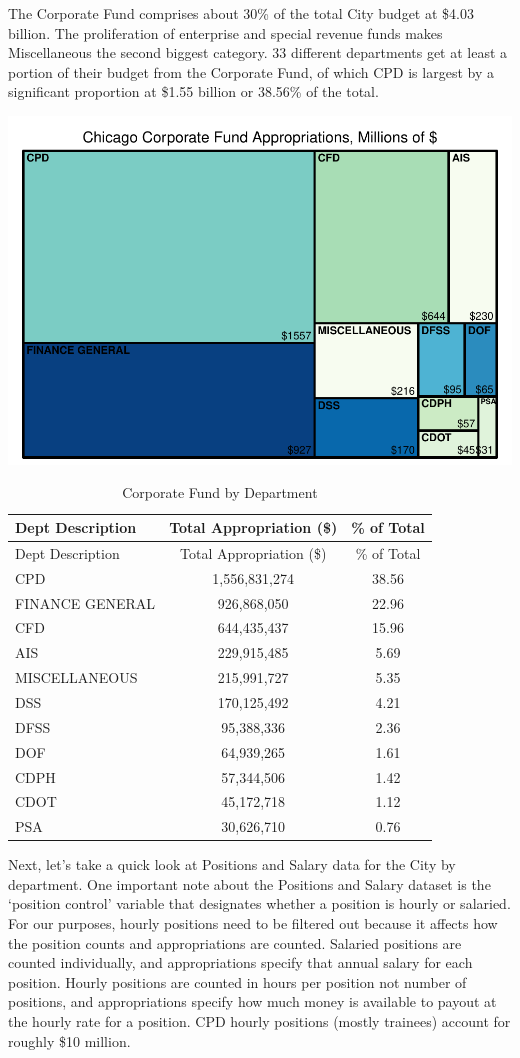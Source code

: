 \documentclass[
]{article}
\begin{document}
The Corporate Fund comprises about 30\% of the total City budget at
\$4.03 billion. The proliferation of enterprise and special revenue
funds makes Miscellaneous the second biggest category. 33 different
departments get at least a portion of their budget from the Corporate
Fund, of which CPD is largest by a significant proportion at \$1.55
billion or 38.56\% of the total.

\begin{center}\includegraphics{cpd_budget_analysis_files/figure-latex/reduced corporate fund treemap-1} \end{center}

\begin{longtable}[]{@{}lcc@{}}
\caption{Corporate Fund by Department}\tabularnewline
\toprule
Dept Description & Total Appropriation (\$) & \% of Total\tabularnewline
\midrule
\endfirsthead
\toprule
Dept Description & Total Appropriation (\$) & \% of Total\tabularnewline
\midrule
\endhead
CPD & 1,556,831,274 & 38.56\tabularnewline
FINANCE GENERAL & 926,868,050 & 22.96\tabularnewline
CFD & 644,435,437 & 15.96\tabularnewline
AIS & 229,915,485 & 5.69\tabularnewline
MISCELLANEOUS & 215,991,727 & 5.35\tabularnewline
DSS & 170,125,492 & 4.21\tabularnewline
DFSS & 95,388,336 & 2.36\tabularnewline
DOF & 64,939,265 & 1.61\tabularnewline
CDPH & 57,344,506 & 1.42\tabularnewline
CDOT & 45,172,718 & 1.12\tabularnewline
PSA & 30,626,710 & 0.76\tabularnewline
\bottomrule
\end{longtable}

Next, let's take a quick look at Positions and Salary data for the City
by department. One important note about the Positions and Salary dataset
is the `position control' variable that designates whether a position is
hourly or salaried. For our purposes, hourly positions need to be
filtered out because it affects how the position counts and
appropriations are counted. Salaried positions are counted individually,
and appropriations specify that annual salary for each position. Hourly
positions are counted in hours per position not number of positions, and
appropriations specify how much money is available to payout at the
hourly rate for a position. CPD hourly positions (mostly trainees)
account for roughly \$10 million.
\end{document}
